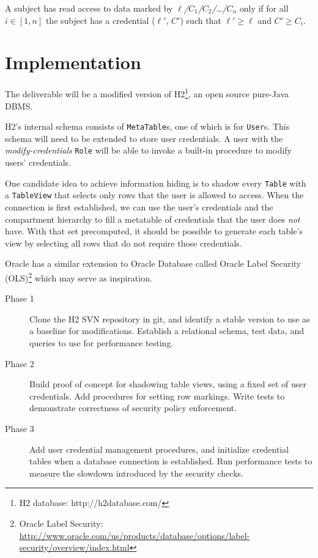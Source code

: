 \documentclass{article}
\begin{document}
A subject has read access to data marked by
{\it $\ell$/$C_1$/$C_2$/\ldots/$C_n$} only if for all $i \in [1, n]$
the subject has a credential ($\ell'$, $C'$) such that
$\ell' \ge \ell$ and $C' \ge C_i$.

\section{Implementation}

The deliverable will be a modified version of
H2\footnote{H2 database: http://h2database.com/},
an open source pure-Java DBMS.

H2's internal schema consists of {\tt MetaTable}s, one of which is
for {\tt User}s. This schema will need to be extended to store user
credentials. A user with the {\it modify-credentials} {\tt Role}
will be able to invoke a built-in procedure to modify users'
credentials.

One candidate idea to achieve information hiding is to shadow every
{\tt Table} with a {\tt TableView} that selects only rows that the
user is allowed to access. When the connection is first established,
we can use the user's credentials and the compartment hierarchy to
fill a metatable of credentials that the user does {\it not} have.
With that set precomputed, it should be possible to generate each
table's view by selecting all rows that do not require those credentials.

Oracle has a similar extension to Oracle Database called
Oracle Label Security (OLS)\footnote{
Oracle Label Security:
\url{http://www.oracle.com/us/products/database/options/label-security/overview/index.html}
} which may serve as inspiration.

\begin{description}

  \item[Phase 1] Clone the H2 SVN repository in git, and identify a stable
    version to use as a baseline for modifications.
    Establish a relational schema, test data, and queries to use for performance
    testing.

  \item[Phase 2] Build proof of concept for shadowing table views,
    using a fixed set of user credentials. Add procedures for setting row markings.
    Write tests to demonstrate correctness of security policy enforcement.

  \item[Phase 3] Add user credential management procedures, and initialize
    credential tables when a database connection is established.
    Run performance tests to measure the slowdown introduced by the security checks.

\end{description}
\end{document}

